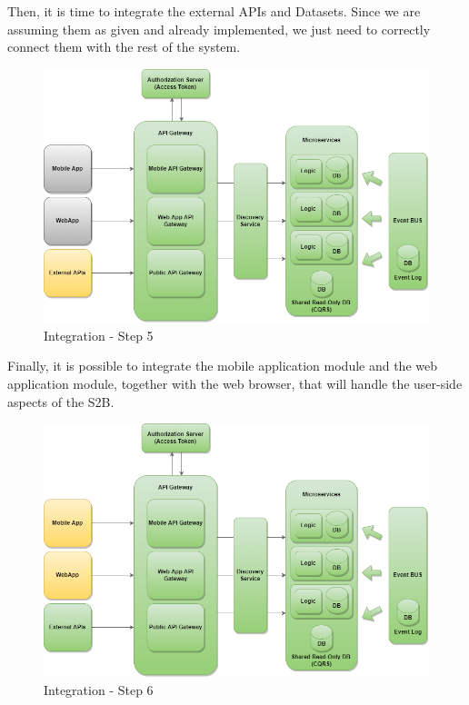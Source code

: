 Then, it is time to integrate the external APIs and Datasets. Since we are assuming them as given and already implemented, we just need to correctly connect them with the rest of the system.

\begin{figure}[H]
	\centering
    \includegraphics[scale=0.4]{Images/Impl, Integr & Test/Integration Plan - Step 5.png}
	\caption{\label{fig:integration_plan_step_5}Integration - Step 5}
\end{figure}

Finally, it is possible to integrate the mobile application module and the web application module, together with the web browser, that will handle the user-side aspects of the S2B.

\begin{figure}[H]
	\centering
    \includegraphics[scale=0.4]{Images/Impl, Integr & Test/Integration Plan - Step 6.png}
	\caption{\label{fig:integration_plan_step_6}Integration - Step 6}
\end{figure}
